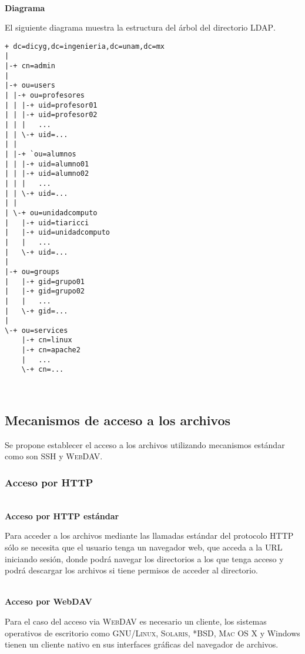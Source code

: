 \textbf{\\ Diagrama \\}

El siguiente diagrama muestra la estructura del \'{a}rbol del directorio \textsc{LDAP}.

{
\scriptsize
\linespread{1}
\begin{verbatim}
+ dc=dicyg,dc=ingenieria,dc=unam,dc=mx
|
|-+ cn=admin
|
|-+ ou=users
| |-+ ou=profesores
| | |-+ uid=profesor01
| | |-+ uid=profesor02
| | |   ...
| | \-+ uid=...
| |
| |-+ `ou=alumnos
| | |-+ uid=alumno01
| | |-+ uid=alumno02
| | |   ...
| | \-+ uid=...
| |
| \-+ ou=unidadcomputo
|   |-+ uid=tiaricci
|   |-+ uid=unidadcomputo
|   |   ...  
|   \-+ uid=...
|  
|-+ ou=groups
|   |-+ gid=grupo01
|   |-+ gid=grupo02
|   |   ...  
|   \-+ gid=...
|
\-+ ou=services
    |-+ cn=linux
    |-+ cn=apache2
    |   ...
    \-+ cn=...
\end{verbatim}
}
\

      \subsection {Mecanismos de acceso a los archivos}

Se propone establecer el acceso a los archivos utilizando mecanismos est\'{a}ndar como son \textsc{SSH} y \textsc{WebDAV}.

        \subsubsection {Acceso por HTTP}

          \textbf{\\ Acceso por HTTP est\'{a}ndar \\}

Para acceder a los archivos mediante las llamadas est\'{a}ndar del protocolo HTTP s\'{o}lo se necesita que el usuario tenga un navegador web, que acceda a la \textsc{URL} iniciando sesi\'{o}n, donde podr\'{a} navegar los directorios a los que tenga acceso y podr\'{a} descargar los archivos si tiene permisos de acceder al directorio.

          \textbf{\\ Acceso por WebDAV \\}

Para el caso del acceso via \textsc{WebDAV} es necesario un cliente, los sistemas operativos de escritorio como \textsc{GNU/Linux}, \textsc{Solaris}, \textsc{*BSD}, \textsc{Mac OS X} y Windows tienen un cliente nativo en sus interfaces gr\'{a}ficas del navegador de archivos.

